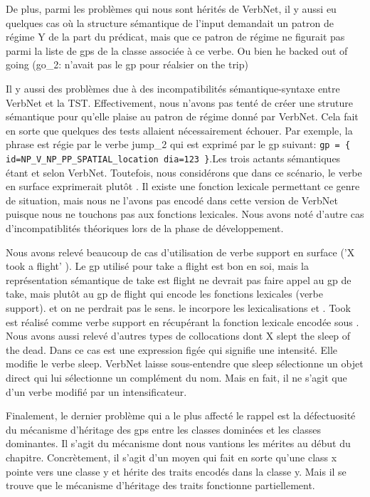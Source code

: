 De plus, parmi les problèmes qui nous sont hérités de VerbNet, il y aussi eu quelques cas où la structure sémantique de l'input demandait un patron de régime Y de la part du prédicat, mais que ce patron de régime ne figurait pas parmi la liste de gps de la classe associée à ce verbe. Ou bien he backed out of going  (go\_2: n'avait pas le gp pour réalsier on the trip)

Il y aussi des problèmes due à des incompatibilités sémantique-syntaxe entre VerbNet et la TST. Effectivement, nous n'avons pas tenté de créer une struture sémantique pour qu'elle plaise au patron de régime donné par VerbNet. Cela fait en sorte que quelques des tests allaient nécessairement échouer. Par exemple, la phrase  est régie par le verbe jump\_2 qui est exprimé par le gp suivant: \lstinline!gp = { id=NP_V_NP_PP_SPATIAL_location dia=123 }!.Les trois actants sémantiques étant   et  selon VerbNet. Toutefois, nous considérons que dans ce scénario, le verbe  en surface exprimerait plutôt . Il existe une fonction lexicale permettant ce genre de situation, mais nous ne l'avons pas encodé dans cette version de VerbNet puisque nous ne touchons pas aux fonctions lexicales. Nous avons noté d'autre cas d'incompatiblités théoriques lors de la phase de développement. 

Nous avons relevé beaucoup de cas d'utilisation de verbe support en surface ('X took a flight' ). Le gp utilisé pour take a flight est bon en soi, mais la représentation sémantique de take est flight ne devrait pas faire appel au gp de take, mais plutôt au gp de flight qui encode les fonctions lexicales (verbe support). et on ne perdrait pas le sens. le  incorpore les lexicalisations  et  . Took est réalisé comme verbe support en récupérant la fonction lexicale encodée sous . Nous avons aussi relevé d'autres types de collocations dont X  slept the sleep of the dead. Dans ce cas  est une expression figée qui signifie une intensité. Elle modifie le verbe sleep. VerbNet laisse sous-entendre que sleep sélectionne un objet direct qui lui sélectionne un complément du nom. Mais en fait, il ne s'agit que d'un verbe modifié par un intensificateur.

Finalement, le dernier problème qui a le plus affecté le rappel est la défectuosité du mécanisme d'héritage des gps entre les classes dominées et les classes dominantes. Il s'agit du mécanisme dont nous vantions les mérites au début du chapitre. Concrètement, il s'agit d'un moyen qui fait en sorte qu'une class x pointe vers une classe y et hérite des traits encodés dans la classe y. Mais il se trouve que le mécanisme d'héritage des traits fonctionne partiellement. 

